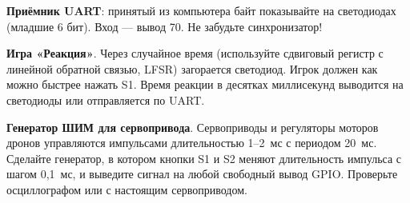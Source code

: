 \begin{taskbox}
\textbf{Приёмник UART}: принятый из компьютера байт показывайте на
светодиодах (младшие 6 бит). Вход --- вывод 70. Не забудьте синхронизатор!
\end{taskbox}

\begin{taskbox}
\textbf{Игра «Реакция»}. Через случайное время (используйте
сдвиговый регистр с линейной обратной связью, LFSR) загорается светодиод.
Игрок должен как можно быстрее нажать S1. Время реакции в десятках миллисекунд
выводится на светодиоды или отправляется по UART.
\end{taskbox}

\begin{taskbox}
\textbf{Генератор ШИМ для сервопривода}. Сервоприводы и регуляторы моторов
дронов управляются импульсами длительностью 1--2~мс с периодом 20~мс.
Сделайте генератор, в котором кнопки S1 и S2 меняют длительность импульса с
шагом 0,1~мс, и выведите сигнал на любой свободный вывод GPIO. Проверьте
осциллографом или с настоящим сервоприводом.
\end{taskbox}
